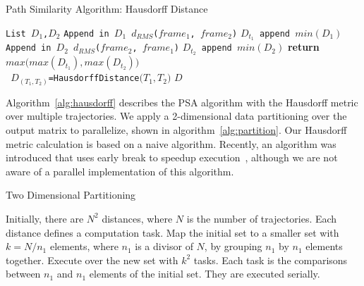\begin{algorithm}[t]
    \scriptsize
    \caption{Path Similarity Algorithm: Hausdorff Distance}
    \label{alg:hausdorff}
    \begin{algorithmic}[1]
        \State \texttt{List $D_1$,$D_2$}
        \State \texttt{Append in $D_1$ $d_{RMS}$($frame_1$, $frame_2$)}
        \EndFor
        \State \texttt{$D_{t_1}$ append $min(D_1)$}
        \EndFor
        \State \texttt{Append in $D_2$ $d_{RMS}$($frame_2$, $frame_1$)}
        \EndFor
        \State\texttt{$D_{t_2}$ append $min(D_2)$}
        \EndFor
        \State \textbf{return} $max\Big(max(D_{t_1}),max(D_{t_2})\Big)$
        \EndProcedure
        \\        
        \State \texttt{ $D_{( T_1,T_2 )}$=HausdorffDistance$\Big( T_1,T_2 \Big)$} 
        \EndFor
        \EndFor
        \State \Return $D$
        \EndProcedure
    \end{algorithmic}
\end{algorithm}

Algorithm~\ref{alg:hausdorff} describes the PSA algorithm with the Hausdorff metric over multiple trajectories.
We apply a 2-dimensional data partitioning over the output matrix to parallelize, shown in algorithm~\ref{alg:partition}.
Our Hausdorff metric calculation is based on a naive algorithm.
Recently, an algorithm was introduced that uses early break to speedup execution~\cite{taha2015efficient}, although we are not aware of a parallel implementation of this algorithm.

\begin{algorithm}[t]
    \scriptsize
    \caption{Two Dimensional Partitioning}
    \label{alg:partition}
    \begin{algorithmic}[1]
        \State Initially, there are $N^2$ distances, where $N$ is the number of trajectories.
        Each distance defines a computation task.
        \State Map the initial set to a smaller set with $k=N/n_1$ elements, where $n_1$ is a divisor of $N$, by grouping $n_1$ by $n_1$ elements together.
        \State Execute over the new set with $k^2$ tasks.
        Each task is the comparisons between $n_1$ and $n_1$  elements of the initial set.
        They are executed serially.
    \end{algorithmic}
\end{algorithm}

